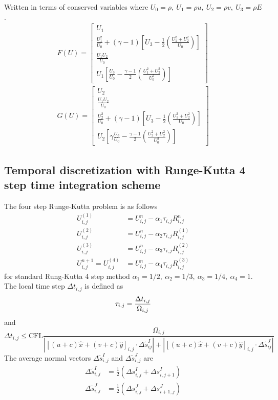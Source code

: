 \documentclass[11pt]{article}
\begin{document}
	Written in terms of conserved variables where $U_0 = \rho,~U_1 = \rho u,~ U_2 = \rho v,~U_3 = \rho E$.
		\begin{align}
		F(U) = \begin{bmatrix} U_1 \\ 
		\frac{U_1^2}{U_0} + (\gamma - 1)\left[U_3 - \frac{1}{2} \left(\frac{U_1^2 + U_2^2}{U_0}\right)\right]\\ 
		\frac{U_1 U_2 }{U_0} \\
		U_1 \left[ \frac{U_3}{U_0} - \frac{\gamma - 1}{2} \left(\frac{U_1^2 + U_2^2}{U_0^2}\right)\right] \end{bmatrix} \\
		G(U)= \begin{bmatrix} U_2 \\ 
		\frac{U_1 U_2 }{U_0} \\
		\frac{U_2^2}{U_0} + (\gamma - 1)\left[U_3 - \frac{1}{2} \left(\frac{U_1^2 + U_2^2}{U_0}\right)\right]\\ 
		U_2 \left[ \gamma \frac{U_3}{U_0} - \frac{\gamma - 1}{2} \left(\frac{U_2^2 + U_2^2}{U_0^2}\right)\right] \end{bmatrix} 
		\end{align}
	
	\subsection{Temporal discretization with Runge-Kutta 4 step time integration scheme}
	The four step Runge-Kutta problem is as follows
		\begin{align}
		U_{i,j}^{(1)} &= U_{i,j}^n - \alpha_1 \tau_{i,j} R_{i,j}^n \\
		U_{i,j}^{(2)} &= U_{i,j}^n - \alpha_2 \tau_{i,j} R_{i,j}^{(1)} \\
		U_{i,j}^{(3)} &= U_{i,j}^n - \alpha_3 \tau_{i,j} R_{i,j}^{(2)} \\
		U_{i,j}^{n+1} = U_{i,j}^{(4)} &= U_{i,j}^n - \alpha_4 \tau_{i,j} R_{i,j}^{(3)} 
		\end{align}
	for standard Rung-Kutta 4 step method $\alpha_1 = 1/2,~\alpha_2 = 1/3,~\alpha_3 = 1/4,~\alpha_4 = 1$.  The local time step $\Delta t_{i,j}$ is defined as
		\begin{equation}
		\tau_{i,j} = \frac{\Delta t_{i,j}}{\Omega_{i,j}} \\
		\end{equation}
	and
		\begin{equation}
		\Delta t_{i,j} \leq \text{CFL} \frac{\Omega_{i,j}}{\left| \left[(u + c)\hat{x} + (v+c)\hat{y}\right]_{i,j}\cdot \Delta \tilde{s}_{ij}^I\right| + \left|  \left[(u + c)\hat{x} + (v+c)\hat{y}\right]_{i,j} \cdot \Delta \tilde{s}_{ij}^J\right|}
		\end{equation}
	The average normal vectors $\Delta\tilde{s}_{i,j}^I$ and $\Delta\tilde{s}_{i,j}^J$ are
		\begin{align}
		\Delta\tilde{s}_{i,j}^I & = \frac{1}{2} \left( \Delta s_{i,j}^I + \Delta s_{i,j+1}^I\right) \\
		\Delta\tilde{s}_{i,j}^J & = \frac{1}{2} \left( \Delta s_{i,j}^J + \Delta s_{i+1,j}^J\right) 
		\end{align}
		
\end{document}
